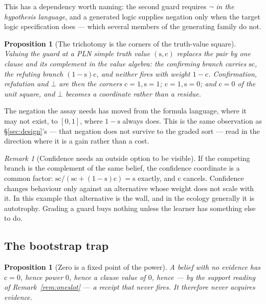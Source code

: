 \documentclass[11pt,a4paper]{article}
\theoremstyle{plain}
\newtheorem{proposition}[theorem]{Proposition}
\theoremstyle{definition}
\theoremstyle{remark}
\newtheorem{remark}[theorem]{Remark}
\newcommand{\str}{\mathrm{s}}
\newcommand{\conf}{\mathrm{c}}
\begin{document}
This has a dependency worth naming: the second guard requires $\neg$ \emph{in the
hypothesis language}, and a generated logic supplies negation only when the
target logic specification does --- which several members of the generating
family do not.

\begin{proposition}[The trichotomy is the corners of the truth-value square]
\label{prop:trichotomy}
Valuing the guard at a PLN simple truth value $(\str,\conf)$ replaces the pair by
one clause and its complement in the \emph{value algebra}: the confirming branch
carries $\str\conf$, the refuting branch $(1-\str)\conf$, and neither fires with
weight $1 - \conf$. Confirmation, refutation and $\bot$ are then the corners
$\conf = 1, \str = 1$; $\conf = 1, \str = 0$; and $\conf = 0$ of the unit square,
and $\bot$ becomes a coordinate rather than a residue.
\end{proposition}

The negation the assay needs has moved from the formula language, where it may
not exist, to $[0,1]$, where $1 - \str$ always does. This is the same observation
as \S\ref{sec:design}'s --- that negation does not survive to the graded sort ---
read in the direction where it is a gain rather than a cost.

\begin{remark}[Confidence needs an outside option to be visible]
\label{rem:cancel}
If the competing branch is the complement of the same belief, the confidence
coordinate is a common factor: $\str\conf / (\str\conf + (1-\str)\conf) = \str$
exactly, and $\conf$ cancels. Confidence changes behaviour only against an
alternative whose weight does not scale with it. In this example that alternative
is the wall, and in the ecology generally it is autotrophy. Grading a guard buys
nothing unless the learner has something else to do.
\end{remark}

\subsection{The bootstrap trap}

\begin{proposition}[Zero is a fixed point of the power]\label{prop:bootstrap}
A belief with no evidence has $\conf = 0$, hence power $0$, hence a clause value
of $0$, hence --- by the support reading of Remark~\ref{rem:oneslot} --- a
receipt that never fires. It therefore never acquires evidence.
\end{proposition}
\end{document}
